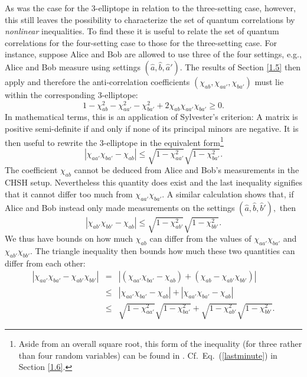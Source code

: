 As was the case for the 3-elliptope in relation to the three-setting case, however, this still leaves the possibility to characterize the set of quantum correlations by \emph{nonlinear} inequalities. To find these it is useful to relate the set of quantum correlations for the four-setting case to those for the three-setting case. For instance, suppose Alice and Bob are allowed to use three of the four settings, e.g., Alice and Bob measure using settings $(\hat{a},\hat{b},\hat{a}')$. The results of Section \ref{1.5} then apply and therefore the anti-correlation coefficients $(\chi_{ab},\chi_{aa'},\chi_{ba'})$ must lie within the corresponding 3-elliptope:
\begin{equation}
1-\chi_{ab}^2-\chi_{aa'}^2-\chi_{ba'}^2+2\chi_{ab}\chi_{aa'}\chi_{ba'}\geq 0.
\label{3-elliptope}
\end{equation}
In mathematical terms, this is an application of Sylvester's criterion: A matrix is positive semi-definite if and only if none of its principal minors are negative. It is then useful to rewrite the 3-elliptope in the equivalent form\footnote{Aside from an overall square root, this form of the inequality (for three rather than four random variables) can be found in \citet[p.\ 486]{Yule 1896}. Cf.\ Eq.\ (\ref{lastminute}) in Section \ref{1.6}.}
\begin{equation}
 |\chi_{aa'}\chi_{ba'}-\chi_{ab}| \leq \sqrt{1-\chi_{aa'}^2}\sqrt{1-\chi_{ba'}^2}.
\end{equation}
The coefficient $\chi_{ab}$ cannot be deduced from Alice and Bob's measurements in the CHSH setup. Nevertheless this quantity does exist and the last inequality signifies that it cannot differ too much from $\chi_{aa'}\chi_{ba'}$. 
A similar calculation shows that, if Alice and Bob instead only made measurements on the settings $(\hat{a},\hat{b},\hat{b}'),$ then
\begin{equation}
 |\chi_{ab'}\chi_{bb'}-\chi_{ab}| \leq \sqrt{1-\chi_{ab'}^2}\sqrt{1-\chi_{bb'}^2}.
\end{equation}
We thus have bounds on how much $\chi_{ab}$ can differ from the values of $\chi_{aa'}\chi_{ba'}$ and $\chi_{ab'}\chi_{bb'}$. The triangle inequality then bounds how much these two quantities can differ from each other:
\begin{eqnarray}
|\chi_{aa'}\chi_{ba'}-\chi_{ab'}\chi_{bb'}|
&=& |(\chi_{aa'}\chi_{ba'}-\chi_{ab})+(\chi_{ab}-\chi_{ab'}\chi_{bb'})| \nonumber \\[.2cm]
&\leq & |\chi_{aa'}\chi_{ba'}-\chi_{ab}|+|\chi_{aa'}\chi_{ba'}-\chi_{ab}| \nonumber \\[.2cm]
&\leq & \sqrt{1-\chi_{aa'}^2}\sqrt{1-\chi_{ba'}^2}+\sqrt{1-\chi_{ab'}^2}\sqrt{1-\chi_{bb'}^2}.
\end{eqnarray}
